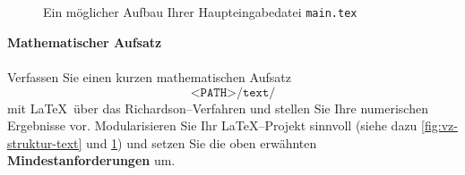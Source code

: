 \begin{figure}[h!]
	\hspace*{0.5cm}\\
	\hspace*{0.5cm}\\
	\hspace*{0.5cm}\\
	\hspace*{0.5cm}\\
	~\\
	\hspace*{0.5cm}\\
	\hspace*{0.5cm}\\
	\hspace*{0.5cm}\\
	\hspace*{0.5cm}\\
	\hspace*{0.5cm}\\
	~\\
	\hspace*{0.5cm}\\
	\hspace*{0.5cm}\\
	\hspace*{0.5cm}\\
	\hspace*{0.5cm}\\
	\hspace*{0.5cm}\ttt{\color{gray} \% }\\
	\hspace*{0.5cm} \\
	\caption{Ein möglicher Aufbau Ihrer Haupteingabedatei \texttt{main.tex}}
	\label{fig:main.tex}
\end{figure}



	\textbf{Mathematischer Aufsatz }\\
	~\\Verfassen Sie einen kurzen mathematischen Aufsatz
	$$	 \texttt{<PATH>/text/} $$
	mit \LaTeX~über das Richardson--Verfahren und stellen Sie Ihre numerischen Ergebnisse vor. Modularisieren Sie Ihr \LaTeX--Projekt sinnvoll (siehe dazu \ref{fig:vz-struktur-text} und \ref{fig:main.tex}) und setzen Sie die oben erwähnten \textbf{Mindestanforderungen} um. \\

